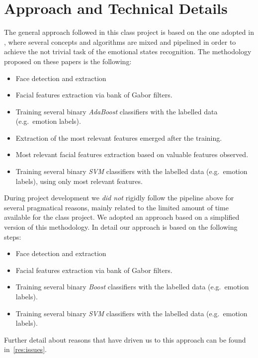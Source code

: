 \section{Approach and Technical Details}

The general approach followed in this class project is based on the one adopted in \cite{Littlewort04dynamicsof,Bartlett06fullyautomatic}, where several concepts and algorithms are mixed and pipelined in order to achieve the not trivial task of the emotional states recognition. The methodology proposed on these papers is the following:

\begin{itemize}
\item Face detection and extraction
\item Facial features extraction via bank of Gabor filters.
\item Training several binary \emph{AdaBoost} classifiers with the labelled data (e.g.\ emotion labels).
\item Extraction of the most relevant features emerged after the training.
\item Most relevant facial features extraction based on valuable features observed.
\item Training several binary \emph{SVM} classifiers with the labelled data (e.g.\ emotion labels), using only most relevant features.
\end{itemize}

During project development we \emph{did not} rigidly follow the pipeline above for several pragmatical reasons, mainly related to the limited amount of time available for the class project. We adopted an approach based on a simplified version of this methodology. In detail our approach is based on the following steps:

\begin{itemize}
\item Face detection and extraction
\item Facial features extraction via bank of Gabor filters.
\item Training several binary \emph{Boost} classifiers with the labelled data (e.g.\ emotion labels).
\item Training several binary \emph{SVM} classifiers with the labelled data (e.g.\ emotion labels).
\end{itemize}

Further detail about reasons that have driven us to this approach can be found in~\ref{res:issues}.\\

